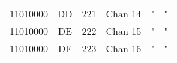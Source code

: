 \begin{center}
\begin{supertabular}{| c | c | c | c | c | c |}
                11010000 & DD & 221 & Chan 14  &                              "                    &                    "                        \\
             11010000 & DE & 222 & Chan 15  &                              "                    &                    "                        \\
                11010000 & DF & 223 & Chan 16  &                              "                    &                    "                        \\
        \end{supertabular}
        \end{center}


